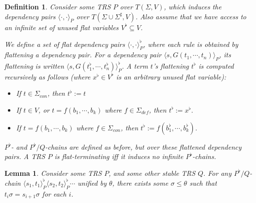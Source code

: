\documentclass{article}
\newtheorem{lemma}[theorem]{Lemma}
\newtheorem{definition}[theorem]{Definition}
\newcommand{\dpair}[2]{\langle #1, #2 \rangle}
\begin{document}
\begin{definition}
    Consider some TRS $P$ over $T(\Sigma, V)$, which induces the dependency pairs $\dpair{\cdot}{\cdot}_P$ over $T(\Sigma \cup \Sigma^\sharp, V)$. Also assume that we have access to an infinite set of unused \emph{flat variables} $V^\flat \subseteq V$.
    
    We define a set of \emph{flat dependency pairs} $\dpair{\cdot}{\cdot}^\flat_P$, where each rule is obtained by \emph{flattening} a dependency pair. For a dependency pair $\dpair{s}{G(t_1 , \cdots, t_n)}_P$, its flattening is written $\dpair{s}{G( t^\flat_1, \cdots, t_n^\flat)}^\flat_P$. A term $t$'s flattening $t^\flat$ is computed recursively as follows (where $x^\flat \in V^\flat$ is an arbitrary unused flat variable):
    \begin{itemize}
        \item If $t \in \Sigma_{con}$, then $t^\flat := t$
        \item If $t \in V$, or $t = f (b_1, \cdots, b_k)$ where $f \in \Sigma_{def}$, then $t^\flat := x^\flat$.
        \item If $t = f( b_1, \cdots, b_k)$ where $f \in \Sigma_{con}$, then $t^\flat := f( b^\flat_1, \cdots, b^\flat_k)$.
    \end{itemize} 
    $P^\flat$- and $P^\flat/Q$-chains are defined as before, but over these flattened dependency pairs. A TRS $P$ is \emph{flat-terminating} iff it induces no infinite $P^\flat$-chains. 
\end{definition}

\begin{lemma} 
    Consider some TRS $P$, and some other stable TRS $Q$. For any $P^\flat/Q$-chain $\dpair{s_1}{t_1}^\flat_P \dpair{s_2}{t_2}^\flat_P \cdots$ unified by $\theta$, there exists some $\sigma \leq \theta$ such that $t_i \sigma = s_{i+1} \sigma$ for each $i$. 
\end{lemma}
\end{document}
